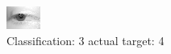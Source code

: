 \begin{figure}[h!]
\begin{center}
\includegraphics[width=0.60\columnwidth]{figures/ID2690_class_3_target_4.png}
\end{center}
\caption{ Classification: 3 actual target: 4}
\label{fig:ID2690_class_3_target_4}
\end{figure}
